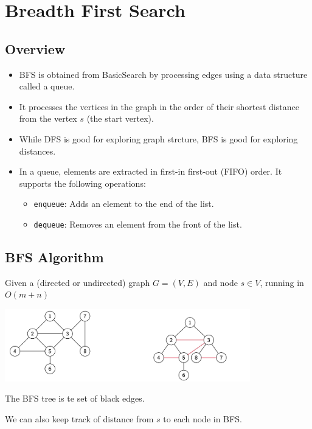 
\section{Breadth First Search}
\subsection{Overview}
\begin{itemize}
    \item BFS is obtained from BasicSearch by processing edges using a data structure called a queue.
    \item It processes the vertices in the graph in the order of their shortest distance from the vertex $s$ (the start vertex).
    \item While DFS is good for exploring graph strcture, BFS is good for exploring distances.
    \item In a queue, elements are extracted in first-in first-out (FIFO) order. It supports the following operations:
    \begin{itemize}
        \item \texttt{enqueue}: Adds an element to the end of the list.
        \item \texttt{dequeue}: Removes an element from the front of the list.
    \end{itemize}
\end{itemize}

\subsection{BFS Algorithm}
\begin{itemize}
    \item Given a (directed or undirected) graph $G = (V, E)$ and node $s \in V$, running in $O(m + n)$
    \item[] 
    \begin{center}
        \item[] \includegraphics[width=0.8\textwidth]{lecture18/images/bfs-undirected-example.jpg}
    \end{center}
    \item The BFS tree is te set of black edges.
    \item We can also keep track of distance from $s$ to each node in BFS.
    \item[] 
\end{itemize}

